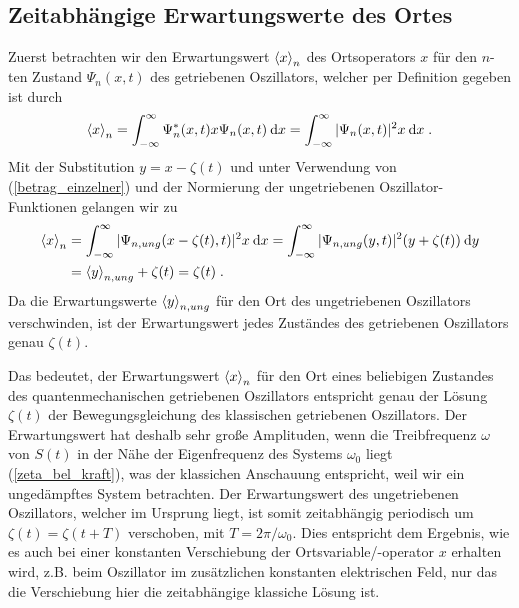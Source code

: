   \subsection{Zeitabhängige Erwartungswerte des Ortes}
    Zuerst betrachten wir den Erwartungswert $\braket{x}_n$ des Ortsoperators $x$ für den $n$-ten Zustand $\Psi_n(x,t)$ des getriebenen Oszillators, welcher per Definition gegeben ist durch
    \begin{equation}
      \braket{x}_n = \int_{-\infty}^{\infty} \Psi_n^*(x,t)x\Psi_n(x,t) \: \text dx
      = \int_{-\infty}^{\infty} |\Psi_n(x,t)|^2 x \: \text dx \; .
    \end{equation}
    Mit der Substitution $y=x-\zeta(t)$ und unter Verwendung von (\ref{betrag_einzelner}) und der Normierung der ungetriebenen Oszillator-Funktionen gelangen wir zu
    \begin{align}
      \begin{split}
        \braket{x}_n &= \int_{-\infty}^{\infty} |\Psi_{n,ung}(x-\zeta(t),t)|^2 x \: \text dx
        = \int_{-\infty}^{\infty} |\Psi_{n,ung}(y,t)|^2 (y+\zeta(t)) \: \text dy \\
        &= \braket{y}_{n,ung} + \zeta(t) = \zeta(t) \; .
      \end{split}
    \end{align}
    Da die Erwartungswerte $\braket{y}_{n,ung}$ für den Ort des ungetriebenen Oszillators verschwinden, ist der Erwartungswert jedes Zuständes des getriebenen Oszillators genau $\zeta(t)$.

    Das bedeutet, der Erwartungswert $\braket{x}_n$ für den Ort eines beliebigen Zustandes des quantenmechanischen getriebenen Oszillators entspricht genau der Lösung $\zeta(t)$ der Bewegungsgleichung des klassischen getriebenen Oszillators.
    Der Erwartungswert hat deshalb sehr große Amplituden, wenn die Treibfrequenz $\omega$ von $S(t)$ in der Nähe der Eigenfrequenz des Systems $\omega_0$ liegt (\ref{zeta_bel_kraft}), was der klassichen Anschauung entspricht, weil wir ein ungedämpftes System betrachten.
    Der Erwartungswert des ungetriebenen Oszillators, welcher im Ursprung liegt, ist somit zeitabhängig periodisch um $\zeta(t)=\zeta(t+T)$ verschoben, mit $T=2\pi/\omega_0$.
    Dies entspricht dem Ergebnis, wie es auch bei einer konstanten Verschiebung der Ortsvariable/-operator $x$ erhalten wird, z.B. beim Oszillator im zusätzlichen konstanten elektrischen Feld, nur das die Verschiebung hier die zeitabhängige klassiche Lösung ist.

